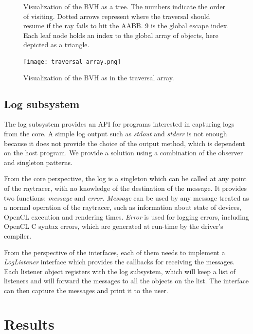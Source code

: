 \documentclass{vgtc}
\begin{document}
\begin{figure}
\centering


\caption{Visualization of the BVH as a tree. The numbers indicate the
  order of visiting. Dotted arrows represent where the traversal
  should resume if the ray fails to hit the AABB. 9 is the global
  escape index. Each leaf node holds an index to the global array of
  objects, here depicted as a triangle.}
\label{fig:bvh}
\end{figure}

\begin{figure}
\centering
\texttt{[image: traversal\_array.png]}
\caption{Visualization of the BVH as in the traversal array.}
\label{fig:traversal_array}
\end{figure}

\subsection{Log subsystem}

The log subsystem provides an API for programs interested in capturing
logs from the core. A simple log output such as \emph{stdout} and
\emph{stderr} is not enough because it does not provide the choice of
the output method, which is dependent on the host program. We provide
a solution using a combination of the observer and singleton patterns.

From the core perspective, the log is a singleton which can be called
at any point of the raytracer, with no knowledge of the destination of
the message. It provides two functions: \emph{message} and
\emph{error}. \emph{Message} can be used by any message treated as a normal
operation of the raytracer, such as information about state of
devices, OpenCL execution and rendering times. \emph{Error} is used for
logging errors, including OpenCL C syntax errors, which are generated at
run-time by the driver's compiler.

From the perspective of the interfaces, each of them needs to implement
a \emph{LogListener} interface which provides the callbacks for
receiving the messages. Each listener object registers with the log
subsystem, which will keep a list of listeners and will forward the
messages to all the objects on the list. The interface can then
capture the messages and print it to the user.

\section{Results}
\label{sec:results}
\end{document}

